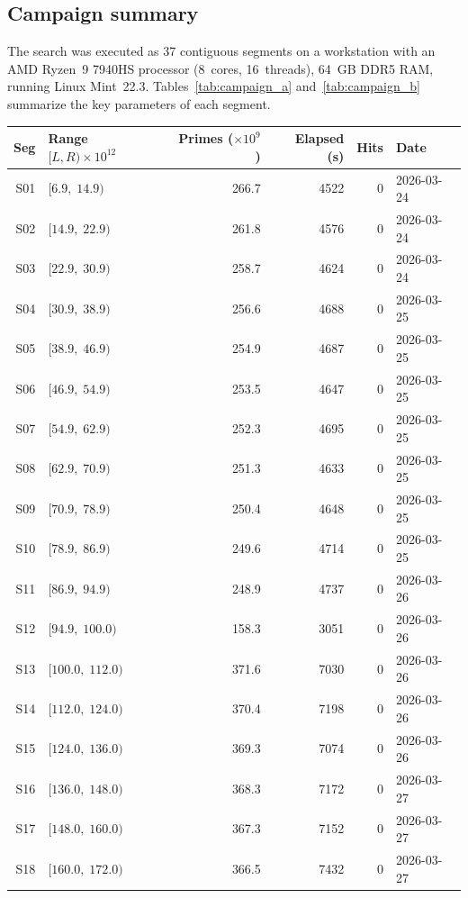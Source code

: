 \documentclass[12pt,reqno]{article}
\theoremstyle{plain}
\theoremstyle{definition}
\theoremstyle{remark}
\begin{document}
\subsection{Campaign summary}
\label{sec:campaign}

The search was executed as 37 contiguous segments on a workstation
with an AMD Ryzen~9 7940HS processor (8~cores, 16~threads),
64~GB DDR5 RAM, running Linux Mint~22.3.
Tables~\ref{tab:campaign_a} and~\ref{tab:campaign_b} summarize the
key parameters of each segment.

\begin{table}[ht]
\begin{center}
\small
\begin{tabular}{rlrrrl}
\toprule
Seg & Range $[L, R) \times 10^{12}$ & Primes ($\times 10^9$)
    & Elapsed (s) & Hits & Date \\
\midrule
S01 & $[6.9,\;14.9)$    & 266.7 & 4522 & 0 & 2026-03-24 \\
S02 & $[14.9,\;22.9)$   & 261.8 & 4576 & 0 & 2026-03-24 \\
S03 & $[22.9,\;30.9)$   & 258.7 & 4624 & 0 & 2026-03-24 \\
S04 & $[30.9,\;38.9)$   & 256.6 & 4688 & 0 & 2026-03-25 \\
S05 & $[38.9,\;46.9)$   & 254.9 & 4687 & 0 & 2026-03-25 \\
S06 & $[46.9,\;54.9)$   & 253.5 & 4647 & 0 & 2026-03-25 \\
S07 & $[54.9,\;62.9)$   & 252.3 & 4695 & 0 & 2026-03-25 \\
S08 & $[62.9,\;70.9)$   & 251.3 & 4633 & 0 & 2026-03-25 \\
S09 & $[70.9,\;78.9)$   & 250.4 & 4648 & 0 & 2026-03-25 \\
S10 & $[78.9,\;86.9)$   & 249.6 & 4714 & 0 & 2026-03-25 \\
S11 & $[86.9,\;94.9)$   & 248.9 & 4737 & 0 & 2026-03-26 \\
S12 & $[94.9,\;100.0)$  & 158.3 & 3051 & 0 & 2026-03-26 \\
S13 & $[100.0,\;112.0)$ & 371.6 & 7030 & 0 & 2026-03-26 \\
S14 & $[112.0,\;124.0)$ & 370.4 & 7198 & 0 & 2026-03-26 \\
S15 & $[124.0,\;136.0)$ & 369.3 & 7074 & 0 & 2026-03-26 \\
S16 & $[136.0,\;148.0)$ & 368.3 & 7172 & 0 & 2026-03-27 \\
S17 & $[148.0,\;160.0)$ & 367.3 & 7152 & 0 & 2026-03-27 \\
S18 & $[160.0,\;172.0)$ & 366.5 & 7432 & 0 & 2026-03-27 \\

\end{tabular}
\end{center}
\end{table}
\end{document}

